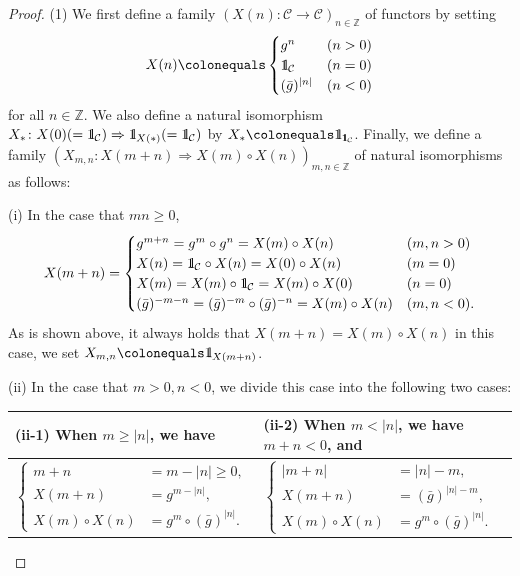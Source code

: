 \documentclass{surv-l}
\numberwithin{equation}{chapter}
\numberwithin{figure}{chapter}
\theoremstyle{plain}
\theoremstyle{definition}
\theoremstyle{remark}
\newcommand{\id}{1\kern-.25em{\text{{\rm l}}}}
\begin{document}
\begin{proof}
(1) We first define a family $(X(n) \colon {\mathcal{C}} \to {\mathcal{C}})_{n \in \mathbb{Z}}$
of functors by setting
\[
X(n)\colonequals 
\begin{cases}
g^n & (n > 0)\\
\id_{\mathcal{C}} & (n=0)\\
(\bar{g})^{|n|} & (n < 0)
\end{cases}
\]
for all $n \in \mathbb{Z}$.
We also define a natural isomorphism
$X_* \colon X(0) (= \id_{\mathcal{C}}) \Rightarrow \id_{X(*)} (= \id_{\mathcal{C}})$
by $X_*\colonequals  \id_{\id_{\mathcal{C}}}$.
Finally, we define a family $(X_{m,n} \colon X(m+n) \Rightarrow X(m)\circ X(n))_{m,n \in \mathbb{Z}}$
of natural isomorphisms as follows:

(i) In the case that $mn \ge 0$,
\[
X(m+n)=
\begin{cases}
g^{m+n}= g^{m}\circ g^{n} = X(m)\circ X(n) & (m, n > 0)\\
X(n) = \id_{{\mathcal{C}}}\circ X(n) = X(0) \circ X(n) & (m = 0)\\
X(m) =X(m)\circ \id_{{\mathcal{C}}} = X(m)\circ X(0)& (n = 0)\\
(\bar{g})^{-m-n} = (\bar{g})^{-m}\circ (\bar{g})^{-n} =X(m)\circ X(n) & (m, n < 0).
\end{cases}
\]
As is shown above, it always holds that
$X(m+n) = X(m)\circ X(n)$ in this case,
we set $X_{m,n}\colonequals  \id_{X(m+n)}$.

(ii) In the case that $m > 0, n <0$, we divide this case into the
following two cases:
\begin{center}
\begin{tabular}{l | l}
(ii-1) When $m \ge |n|$, we have &(ii-2) When $m < |n|$, we have $m+n < 0$, and\\
\hline
$
\left\{
\begin{aligned}
m+n &= m - |n| \ge 0, \\
X(m+n) &= g^{m-|n|}, \\
X(m)\circ X(n) &= g^{m}\circ (\bar{g})^{|n|}.
\end{aligned}
\right.
$
&
$
\left\{
\begin{aligned}
|m+n| &= |n| - m, \\
X(m+n) &= (\bar{g})^{|n|-m}, \\
X(m)\circ X(n) &= g^{m}\circ (\bar{g})^{|n|}.
\end{aligned}
\right.
$
\end{tabular}
\end{center}


\end{proof}
\end{document}
